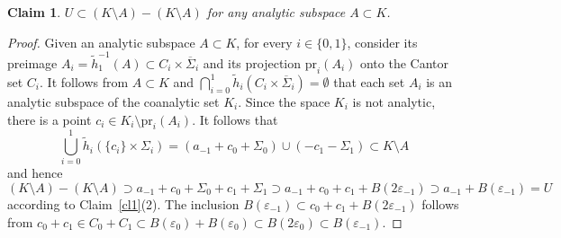 \documentclass[11pt]{amsart}
\newtheorem{claim}{Claim}
\begin{document}
\begin{claim} $U\subset (K\setminus A)-(K\setminus A)$ for any analytic subspace $A\subset K$.
\end{claim}

\begin{proof} Given an analytic subspace $A\subset K$, for every $i\in\{0,1\}$, consider its preimage $A_i=\tilde h_1^{-1}(A)\subset C_i\times\overline{\Sigma}_i$ and its projection ${\mathrm{pr}}_i(A_i)$ onto the Cantor set $C_i$. It follows from $A\subset K$ and $\bigcap_{i=0}^1\tilde h_i(C_i\times\overline{\Sigma}_i)=\emptyset$ that each set $A_i$ is an analytic subspace of the coanalytic set $K_i$. Since the space $K_i$ is not analytic, there is a point  $c_i\in K_i\setminus {\mathrm{pr}}_i(A_i)$. It follows that
$$\bigcup_{i=0}^1\tilde h_i(\{c_i\}\times\Sigma_i)=(a_{-1}+c_0+\Sigma_0)\cup(-c_1-\Sigma_1)\subset K\setminus A$$ and hence
$$(K\setminus A)-(K\setminus A)\supset a_{-1}+c_0+\Sigma_0+c_1+\Sigma_1\supset a_{-1}+c_0+c_1+B(2{\varepsilon}_{-1})\supset a_{-1}+B({\varepsilon}_{-1})=U$$according to Claim~\ref{cl1}(2).
The inclusion $B({\varepsilon}_{-1})\subset c_0+c_1+B(2{\varepsilon}_{-1})$ follows from $c_0+c_1\in C_0+C_1\subset B({\varepsilon}_0)+B({\varepsilon}_0)\subset B(2{\varepsilon}_0)\subset B({\varepsilon}_{-1})$.
\end{proof}
\end{document}
